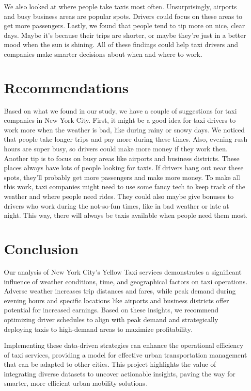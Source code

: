 \documentclass[11pt]{article}
\begin{document}
We also looked at where people take taxis most often. Unsurprisingly, airports and busy business areas are popular spots. Drivers could focus on these areas to get more passengers. Lastly, we found that people tend to tip more on nice, clear days. Maybe it's because their trips are shorter, or maybe they're just in a better mood when the sun is shining. All of these findings could help taxi drivers and companies make smarter decisions about when and where to work.

\section{Recommendations}
Based on what we found in our study, we have a couple of suggestions for taxi companies in New York City. First, it might be a good idea for taxi drivers to work more when the weather is bad, like during rainy or snowy days. We noticed that people take longer trips and pay more during these times. Also, evening rush hours are super busy, so drivers could make more money if they work then.
Another tip is to focus on busy areas like airports and business districts. These places always have lots of people looking for taxis. If drivers hang out near these spots, they'll probably get more passengers and make more money. To make all this work, taxi companies might need to use some fancy tech to keep track of the weather and where people need rides. They could also maybe give bonuses to drivers who work during the not-so-fun times, like in bad weather or late at night. This way, there will always be taxis available when people need them most.

\section{Conclusion}
Our analysis of New York City's Yellow Taxi services demonstrates a significant influence of weather conditions, time, and geographical factors on taxi operations. Adverse weather increases trip distances and fares, while peak demand during evening hours and specific locations like airports and business districts offer potential for increased earnings. Based on these insights, we recommend optimizing driver schedules to align with peak demand and strategically deploying taxis to high-demand areas to maximize profitability.

Implementing these data-driven strategies can enhance the operational efficiency of taxi services, providing a model for effective urban transportation management that can be adapted to other cities. This project highlights the value of integrating diverse datasets to uncover actionable insights, paving the way for smarter, more efficient urban mobility solutions.



\clearpage

\printbibliography
\end{document}
